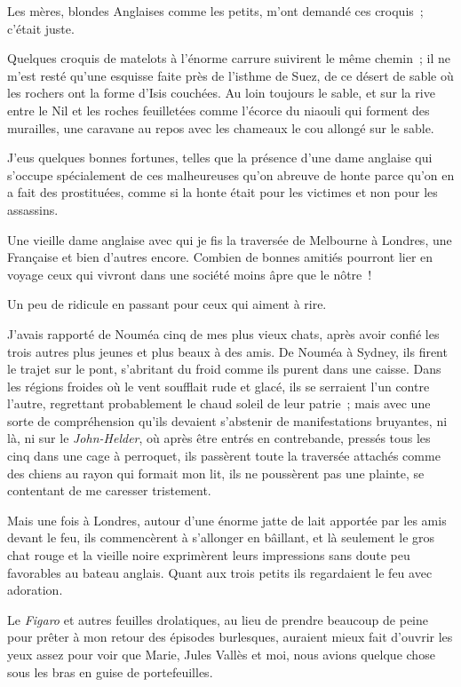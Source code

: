 \documentclass[french,twoside]{book} %
\begin{document}
 Les mères, blondes Anglaises comme les petits, m’ont demandé ces croquis ; c’était juste.\par
Quelques croquis de matelots à l’énorme carrure suivirent le même chemin ; il ne m’est resté qu’une esquisse faite près de l’isthme de Suez, de ce désert de sable où les rochers ont la forme d’Isis couchées. Au loin toujours le sable, et sur la rive entre le Nil et les roches feuilletées comme l’écorce du niaouli qui forment des murailles, une caravane au repos avec les chameaux le cou allongé sur le sable.\par
J’eus quelques bonnes fortunes, telles que la présence d’une dame anglaise qui s’occupe spécialement de ces malheureuses qu’on abreuve de honte parce qu’on en a fait des prostituées, comme si la honte était pour les victimes et non pour les assassins.\par
Une vieille dame anglaise avec qui je fis la traversée de Melbourne à Londres, une Française et bien d’autres encore. Combien de bonnes amitiés pourront lier en voyage ceux qui vivront dans une société moins âpre que le nôtre !\par
Un peu de ridicule en passant pour ceux qui aiment à rire.\par
J’avais rapporté de Nouméa cinq de mes plus vieux chats, après avoir confié les trois autres plus jeunes et plus beaux à des amis. De Nouméa  à Sydney, ils firent le trajet sur le pont, s’abritant du froid comme ils purent dans une caisse. Dans les régions froides où le vent soufflait rude et glacé, ils se serraient l’un contre l’autre, regrettant probablement le chaud soleil de leur patrie ; mais avec une sorte de compréhension qu’ils devaient s’abstenir de manifestations bruyantes, ni là, ni sur le \emph{John-Helder}, où après être entrés en contrebande, pressés tous les cinq dans une cage à perroquet, ils passèrent toute la traversée attachés comme des chiens au rayon qui formait mon lit, ils ne poussèrent pas une plainte, se contentant de me caresser tristement.\par
Mais une fois à Londres, autour d’une énorme jatte de lait apportée par les amis devant le feu, ils commencèrent à s’allonger en bâillant, et là seulement le gros chat rouge et la vieille noire exprimèrent leurs impressions sans doute peu favorables au bateau anglais. Quant aux trois petits ils regardaient le feu avec adoration.\par
Le \emph{Figaro} et autres feuilles drolatiques, au lieu de prendre beaucoup de peine pour prêter à mon retour des épisodes burlesques, auraient mieux fait d’ouvrir les yeux assez pour voir que Marie, Jules Vallès et moi, nous avions quelque chose sous les bras en guise de portefeuilles.\par
\end{document}
